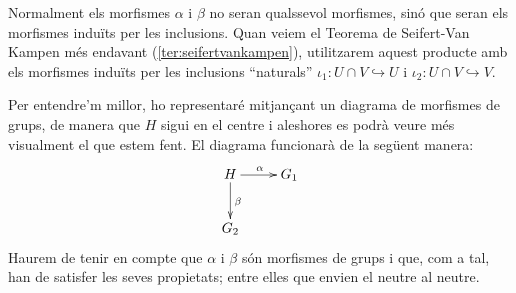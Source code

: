 \documentclass[../main.tex]{subfiles}
\begin{document}
Normalment els morfismes $\alpha$ i $\beta$ no seran qualssevol morfismes, sinó que seran els morfismes induïts per les inclusions. Quan veiem el Teorema de Seifert-Van Kampen més endavant (\ref{ter:seifertvankampen}), utilitzarem aquest producte amb els morfismes induïts per les inclusions ``naturals'' $\iota_1:U\cap V\hookrightarrow U$ i $\iota_2:U\cap V\hookrightarrow V$.

Per entendre'm millor, ho representaré mitjançant un diagrama de morfismes de grups, de manera que $H$ sigui en el centre i aleshores es podrà veure més visualment el que estem fent. 
El diagrama funcionarà de la següent manera:
\begin{equation}
    \notag
    \xymatrix{
    H\ar[r]^{\alpha} \ar[d]^{\beta} & G_1\\
    G_2
    }
\end{equation}
Haurem de tenir en compte que $\alpha$ i $\beta$ són morfismes de grups i que, com a tal, han de satisfer les seves propietats; entre elles que envien el neutre al neutre.
\end{document}
